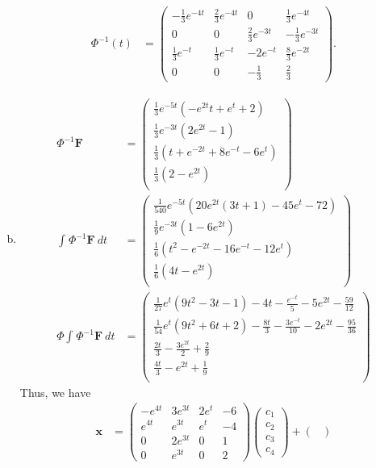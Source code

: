 \documentclass[10pt]{mypackage}
\begin{document}
\begin{solution}[8.3, Problem 35]
\begin{enumerate}[(a)]
\begin{align*}
        \Phi^{-1}(t) &= \begin{pmatrix}-\frac{1}{3}e^{-4t} & \frac{2}{3}e^{-4t} & 0 & \frac{1}{3}e^{-4t} \\ 0 & 0 & \frac{2}{3}e^{-3t} & -\frac{1}{3}e^{-3t} \\ \frac{1}{3}e^{-t} & \frac{1}{3}e^{-t} & -2e^{-t} & \frac{8}{3}e^{-2t} \\ 0 & 0 & -\frac{1}{3} & \frac{2}{3}\end{pmatrix}.
      \end{align*}
    \item 
      \begin{align*}
        \Phi^{-1}\mathbf{F} &= 
\begin{pmatrix}
 \frac{1}{3} e^{-5 t} \left(-e^{2 t} t+e^t+2\right) \\
 \frac{1}{3} e^{-3 t} \left(2 e^{2 t}-1\right) \\
 \frac{1}{3} \left(t+e^{-2 t}+8 e^{-t}-6 e^t\right) \\
 \frac{1}{3} \left(2-e^{2 t}\right) \\
\end{pmatrix}\\
        \int_{}^{} \Phi^{-1}\mathbf{F} \:dt &= 
\begin{pmatrix}
 \frac{1}{540} e^{-5 t} \left(20 e^{2 t} (3 t+1)-45 e^t-72\right) \\
 \frac{1}{9} e^{-3 t} \left(1-6 e^{2 t}\right) \\
 \frac{1}{6} \left(t^2-e^{-2 t}-16 e^{-t}-12 e^t\right) \\
 \frac{1}{6} \left(4 t-e^{2 t}\right) \\
\end{pmatrix}\\
        \Phi \int_{}^{} \Phi^{-1}\mathbf{F}\:dt &= 
\begin{pmatrix}
 \frac{1}{27} e^t \left(9 t^2-3 t-1\right)-4 t-\frac{e^{-t}}{5}-5 e^{2 t}-\frac{59}{12} \\
 \frac{1}{54} e^t \left(9 t^2+6 t+2\right)-\frac{8 t}{3}-\frac{3 e^{-t}}{10}-2 e^{2 t}-\frac{95}{36} \\
 \frac{2 t}{3}-\frac{3 e^{2 t}}{2}+\frac{2}{9} \\
 \frac{4 t}{3}-e^{2 t}+\frac{1}{9} \\
\end{pmatrix}
      \end{align*}
      Thus, we have
      \begin{align*}
        \mathbf{x} &= \begin{pmatrix}-e^{4t} & 3e^{3t} & 2e^{t} & -6\\ e^{4t} & e^{3t} & e^{t} & -4\\ 0 & 2e^{3t} & 0 & 1\\0 & e^{3t} & 0 & 2 \end{pmatrix} \begin{pmatrix}c_1\\c_2\\c_3\\c_4\end{pmatrix} + \begin{pmatrix}

\end{pmatrix}
\end{align*}
\end{enumerate}
\end{solution}
\end{document}
